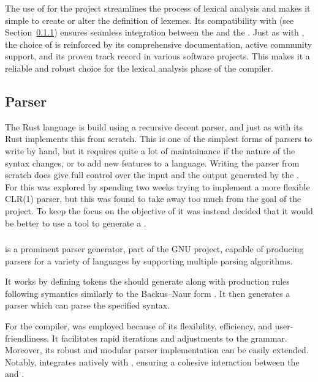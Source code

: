 The use of \lexerGen{} for the \lang{} project streamlines the process of lexical
analysis and makes it simple to create or alter the definition of lexemes. Its
compatibility with \parserGen{} (see Section~\ref{sec:bison}) ensures seamless integration between the \lexer{} and
the \parser. Just as with \parserGen, the choice of \lexerGen{} is reinforced by its
comprehensive documentation, active community support, and its proven track record in
various software projects. This makes it a reliable and robust choice for the lexical
analysis phase of the \lang{} compiler.

\subsection{Parser}
\label{sec:techParser}

The Rust language is build using a recursive decent parser, and just as with its
\lexer{} Rust implements this from scratch\cite{RUST-COMPILER-SRC}. This is one of
the simplest forms of parsers to write by hand, but it requires quite a lot of
maintainance if the nature of the syntax changes, or to add new features to a
language. Writing the parser from scratch does give full control over the input
and the output \ast{} generated by the \parser{}. For \lang{} this was explored
by spending two weeks trying to implement a more flexible CLR(1) parser, but this was
found to take away too much from the goal of the project. To keep the focus on the
objective of \lang{} it was instead decided that it would be better to use a tool to
generate a \parser{}.

\subsubsection{\parserGen{}}
\label{sec:bison}

\parserGen{} is a prominent parser generator, part of the GNU project, capable of
producing parsers for a variety of languages by supporting multiple parsing
algorithms\cite{BISON}. 

It works by defining tokens the \lexer{} should generate along with production rules
following symantics similarly to the Backus–Naur form \cite{BNF}. It then generates a
parser which can parse the specified syntax.

For the \lang{} compiler, \parserGen{} was employed because of its flexibility,
efficiency, and user-friendliness. It facilitates rapid iterations and adjustments to
the grammar. Moreover, its robust and modular parser implementation can be easily
extended. Notably, \parserGen{} integrates natively with \lexerGen{}, ensuring a
cohesive interaction between the \lexer{} and \parser{}.

